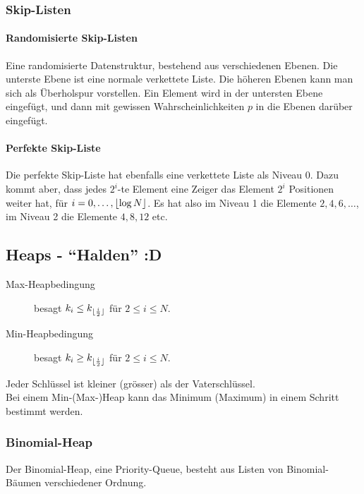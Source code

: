 \documentclass[a4paper, 9pt, DIV=20]{scrartcl}
\DeclarePairedDelimiter{\floor}{\lfloor}{\rfloor}
\begin{document}
\subsubsection{Skip-Listen}
\paragraph{Randomisierte Skip-Listen}
Eine randomisierte Datenstruktur, bestehend aus verschiedenen Ebenen. Die unterste Ebene ist eine normale verkettete Liste. Die höheren Ebenen kann man sich als Überholspur vorstellen. Ein Element wird in der untersten Ebene eingefügt, und dann mit gewissen Wahrscheinlichkeiten $p$ in die Ebenen darüber eingefügt.

\paragraph{Perfekte Skip-Liste}
Die perfekte Skip-Liste hat ebenfalls eine verkettete Liste als Niveau 0. Dazu kommt aber, dass jedes $2^{i}$-te Element eine Zeiger das Element $2^{i}$ Positionen weiter hat, für $i=0,\dots,\floor{\log{N}}$. Es hat also im Niveau 1 die Elemente $2,4,6,\dots$, im Niveau 2 die Elemente $4, 8, 12$ etc.


\subsection{Heaps - ``Halden'' :D}
\begin{description}
\item[Max-Heapbedingung] besagt $k_{i}\leq k_{\floor{\frac{i}{2}}}$ für $2 \leq i \leq N$.
\item[Min-Heapbedingung] besagt $k_{i}\geq k_{\floor{\frac{i}{2}}}$ für $2 \leq i \leq N$.
\end{description}
Jeder Schlüssel ist kleiner (grösser) als der Vaterschlüssel. \\
Bei einem Min-(Max-)Heap kann das Minimum (Maximum) in einem Schritt bestimmt werden.

\subsubsection{Binomial-Heap}
Der Binomial-Heap, eine Priority-Queue, besteht aus Listen von Binomial-Bäumen verschiedener Ordnung. 
\end{document}
